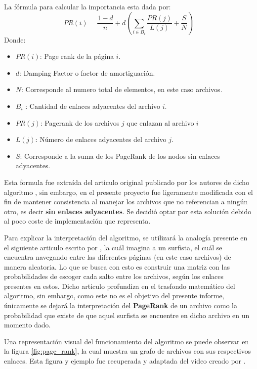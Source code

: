 La fórmula para calcular la importancia esta dada por:
\begin{equation}
PR(i) = \frac{1-d}{n} +d\left( \sum\limits_{i \in B_{i}}^{} \frac{PR(j)}{L(j)} +\frac{S}{N} \right)
\label{eq:PageRank}
\end{equation}
Donde:
\begin{itemize}
    \item $PR(i)$: Page rank de la página $i$.
    \item $d$: Damping Factor o factor de amortiguación.
    \item $N$: Corresponde al numero total de elementos, en este caso archivos.
    \item $B_{i}$ : Cantidad de enlaces adyacentes del archivo $i$.
    \item $PR(j)$: Pagerank de los archivos $j$ que enlazan al archivo $i$
    \item $L(j)$: Número de enlaces adyacentes del archivo $j$.
    \item $S$: Corresponde a la suma de los PageRank de los nodos sin enlaces adyacentes.
\end{itemize}

Esta formula fue extraída del articulo original publicado por los autores de dicho algoritmo \cite{PageRankArticle}, sin embargo, en el presente proyecto fue ligeramente modificada con el fin de mantener consistencia al manejar los archivos que no referencian a ningún otro, es decir \textbf{sin enlaces adyacentes}. Se decidió optar por esta solución debido al poco coste de implementación que representa.

Para explicar la interpretación del algoritmo, se utilizará la analogía presente en el siguiente articulo escrito por \textcite{IntroduccionPageRank}, la cuál imagina a un surfista, el cuál se encuentra navegando entre las diferentes páginas (en este caso archivos) de manera aleatoria. Lo que se busca con esto es construir una matriz con las probabilidades de escoger cada salto entre los archivos, según los enlaces presentes en estos. Dicho articulo profundiza en el trasfondo matemático del algoritmo, sin embargo, como este no es el objetivo del presente informe, únicamente se dejará la interpretación del \textbf{PageRank} de un archivo como la probabilidad que existe de que aquel surfista se encuentre en dicho archivo en un momento dado.

Una representación visual del funcionamiento del algoritmo se puede observar en la figura \ref{fig:page_rank}, la cual muestra un grafo de archivos con sus respectivos enlaces. Esta figura y ejemplo fue recuperada y adaptada del video creado por \textcite{PageRankVideo}.

